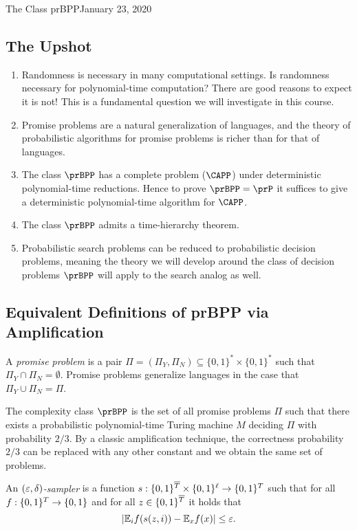 \begin{lecture}{1}{The Class prBPP}{January 23, 2020}
\label{lec:01}

\subsection*{The Upshot}

\begin{enumerate}
  \item Randomness is necessary in many computational settings. Is randomness
    necessary for polynomial-time computation? There are good reasons to expect
    it is not! This is a fundamental question we will investigate in this
    course.
  \item Promise problems are a natural generalization of languages, and the
    theory of probabilistic algorithms for promise problems is richer than
    for that of languages.
  \item The class $\prBPP$ has a complete problem ($\CAPP$) under deterministic
    polynomial-time reductions. Hence to prove $\prBPP = \prP$ it suffices
    to give a deterministic polynomial-time algorithm for $\CAPP$.
  \item The class $\prBPP$ admits a time-hierarchy theorem.
  \item Probabilistic search problems can be reduced to probabilistic decision
    problems, meaning the theory we will develop around the class of decision
    problems $\prBPP$ will apply to the search analog as well.
\end{enumerate}

\subsection{Equivalent Definitions of prBPP via Amplification}

A \emph{promise problem} is a pair $\Pi = (\Pi_Y, \Pi_N) \subseteq \{0, 1\}^*
\times \{0, 1\}^*$ such that $\Pi_Y \cap \Pi_N = \emptyset$. Promise problems
generalize languages in the case that $\Pi_Y \cup \Pi_N = \Pi$.

The complexity class $\prBPP$ is the set of all promise problems $\Pi$ such
that there exists a probabilistic polynomial-time Turing machine $M$ deciding
$\Pi$ with probability $2/3$. By a classic amplification technique, the
correctness probability $2/3$ can be replaced with any other constant and we
obtain the same set of problems.

\begin{definition}
  An \emph{$(\varepsilon, \delta)$-sampler} is a function $s :
  \{0,1\}^{\overline{T}} \times \{0,1\}^\ell \to \{0,1\}^T$ such that for
  all $f : \{0,1\}^T \to \{0,1\}$ and for all $z \in
  \{0,1\}^{\overline{T}}$ it holds that \[
    |\mathbb{E}_i f(s(z, i)) - \mathbb{E}_x f(x)| \le \varepsilon.
  \]
\end{definition}


\end{lecture}

